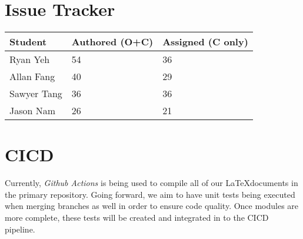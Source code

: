 \documentclass{article}
\begin{document}
\section{Issue Tracker}

\begin{table}[H]
\centering
\begin{tabular}{lll}
\toprule
\textbf{Student} & \textbf{Authored (O+C)} & \textbf{Assigned (C only)}\\
\midrule
Ryan Yeh & 54 & 36 \\
Allan Fang & 40 & 29 \\
Sawyer Tang & 36 & 36 \\
Jason Nam & 26 & 21 \\
\bottomrule
\end{tabular}
\end{table}


\section{CICD}

Currently, \textit{Github Actions} is being used to compile all of our \LaTeX documents in the primary repository.
Going forward, we aim to have unit tests being executed when merging branches as well in order to ensure code quality.
Once modules are more complete, these tests will be created and integrated in to the CICD pipeline.
\end{document}
